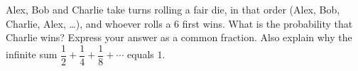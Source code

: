 Alex, Bob and Charlie take turns rolling a fair die, in that order (Alex, Bob, Charlie, Alex, \dots), and whoever rolls a $6$ first wins. What is the probability that Charlie wins? Express your answer as a common fraction. Also explain why the infinite sum $\dfrac{1}{2}+\dfrac{1}{4}+\dfrac{1}{8}+\cdots$ equals $1$.
